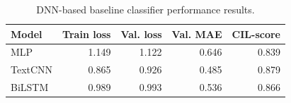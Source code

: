 \begin{table}[htbp]
\centering
\small
\caption{DNN-based baseline classifier performance results.}
\label{tab:dnn-baselines-no-variance}
\begin{tabular}{lrrrr}
\toprule
Model & Train loss & Val. loss & Val. MAE & CIL-score \\
\midrule
MLP & 1.149 & 1.122 & 0.646 & 0.839 \\
TextCNN & 0.865 & 0.926 & 0.485 & 0.879 \\
BiLSTM & 0.989 & 0.993 & 0.536 & 0.866 \\
\bottomrule
\end{tabular}
\end{table}
